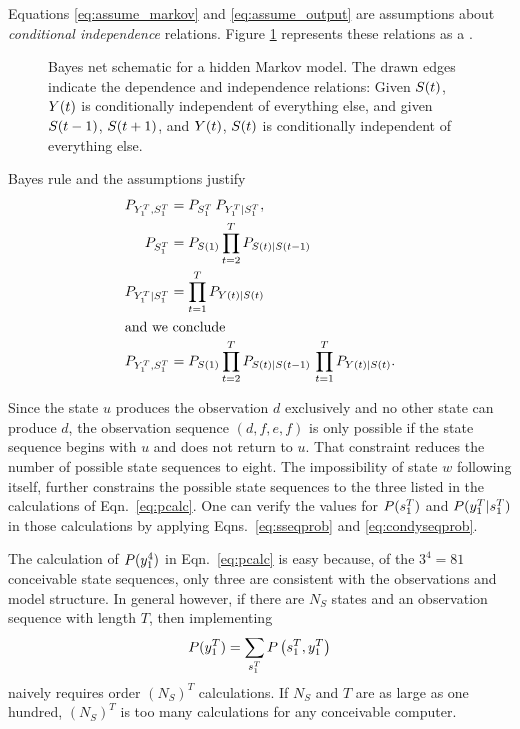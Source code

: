 Equations \eqref{eq:assume_markov} and \eqref{eq:assume_output} are
assumptions about \emph{conditional independence} relations.  Figure
\ref{fig:dhmm_net} represents these relations as a %
\emph{}\cite{Pearl91a}.

\begin{figure}[htbp]
  \centering{\plotsize%
    }
  \caption[Bayes net schematic for a hidden Markov model.]%
  {Bayes net schematic for a hidden Markov model.  The drawn edges
    indicate the dependence and independence relations: Given
    ${S}{(t)}$, ${Y}{(t)}$ is conditionally independent of
    everything else, and given ${S}{(t-1)}$, ${S}{(t+1)}$, and
    ${Y}{(t)}$, ${S}{(t)}$ is conditionally independent of
    everything else.}
  \label{fig:dhmm_net}
\end{figure}

Bayes rule and the assumptions justify
\begin{align}
  P_{\ts{Y}{1}{T},\ts{S}{1}{T}} &= P_{\ts{S}{1}{T}} \, %
                                   P_{\ts{Y}{1}{T}|\ts{S}{1}{T}},\notag\\
  \label{eq:sseqprob}%
  P_{\ts{S}{1}{T}}              &= P_{\ti{S}{1}} %
                                   \prod_{t=2}^T P_{\ti{S}{t}|\ti{S}{t-1}}\\
  \label{eq:condyseqprob}%
  P_{\ts{Y}{1}{T}|\ts{S}{1}{T}} &= \prod_{t=1}^T P_{\ti{Y}{t}|\ti{S}{t}}\\
  \intertext{and we conclude}
  P_{\ts{Y}{1}{T},\ts{S}{1}{T}} &= P_{\ti{S}{1}} %
                                   \prod_{t=2}^T P_{\ti{S}{t}|\ti{S}{t-1}}\, %
                                   \prod_{t=1}^T P_{\ti{Y}{t}|\ti{S}{t}}.\notag
\end{align}

Since the state $u$ produces the observation $d$ exclusively and no
other state can produce $d$, the observation sequence $(d,f,e,f)$ is
only possible if the state sequence begins with $u$ and does not
return to $u$.  That constraint reduces the number of possible state
sequences to eight.  The impossibility of state $w$ following itself,
further constrains the possible state sequences to the three listed in
the calculations of Eqn.~\eqref{eq:pcalc}.  One can verify the values
for $P(s_{1}^{T})$ and $P(y_{1}^{T}|s_{1}^{T})$ in those
calculations by applying Eqns.~\eqref{eq:sseqprob} and
\eqref{eq:condyseqprob}.

The calculation of $P(y_{1}^{4})$ in Eqn.~\eqref{eq:pcalc} is easy
because, of the $3^4 = 81$ conceivable state sequences, only three are
consistent with the observations and model structure.  In general
however, if there are $N_S$ states and an observation sequence with
length $T$, then implementing
\begin{equation*}
  P(y_{1}^{T}) = \sum_{s_{1}^{T}} P\left(s_{1}^{T}
    ,y_{1}^{T} \right)
\end{equation*}
naively requires order $\left(N_S\right)^T$ calculations.  If $N_S$
and $T$ are as large as one hundred, $\left(N_S\right)^T$ is too many
calculations for any conceivable computer.

